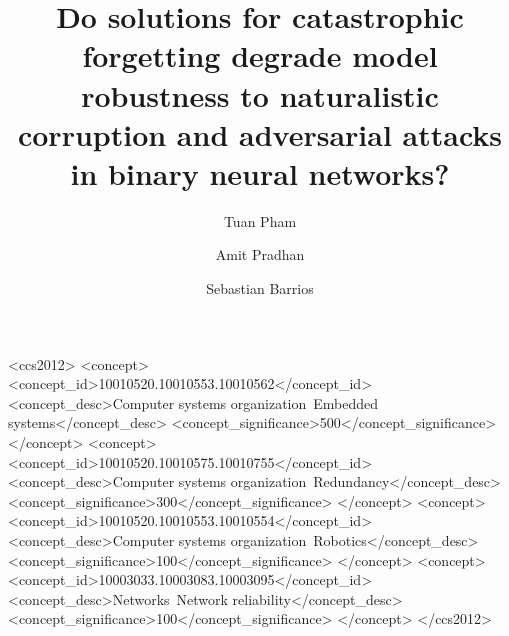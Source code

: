 \documentclass[manuscript,screen,review]{acmart}
\begin{document}
\title[Continual learning vesus robustness]{Do solutions for catastrophic forgetting degrade model robustness to naturalistic corruption and adversarial attacks in binary neural networks?}

\author{Tuan Pham}

\author{Amit Pradhan}

\author{Sebastian Barrios}


\begin{abstract}
  
\end{abstract}


\begin{CCSXML}
<ccs2012>
 <concept>
  <concept_id>10010520.10010553.10010562</concept_id>
  <concept_desc>Computer systems organization~Embedded systems</concept_desc>
  <concept_significance>500</concept_significance>
 </concept>
 <concept>
  <concept_id>10010520.10010575.10010755</concept_id>
  <concept_desc>Computer systems organization~Redundancy</concept_desc>
  <concept_significance>300</concept_significance>
 </concept>
 <concept>
  <concept_id>10010520.10010553.10010554</concept_id>
  <concept_desc>Computer systems organization~Robotics</concept_desc>
  <concept_significance>100</concept_significance>
 </concept>
 <concept>
  <concept_id>10003033.10003083.10003095</concept_id>
  <concept_desc>Networks~Network reliability</concept_desc>
  <concept_significance>100</concept_significance>
 </concept>
</ccs2012>
\end{CCSXML}


\end{document}
